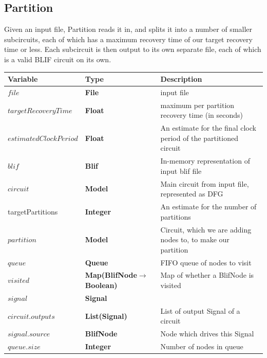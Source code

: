 \documentclass[12pt,final,oneside]{dwThesis} %
\begin{document}
   \newpage 
   \subsection{Partition}
   \label{algPartition} Given an input file,
   Partition reads it in, and splits it into a number of smaller subcircuits,
   each of which has a maximum recovery time of our target recovery time or
   less. Each subcircuit is then output to its own separate file, each of which
   is a valid \gls{BLIF} circuit on its own.  
   \begin{table}

      \begin{center}


         \begin{tabularx}
            {\linewidth}{llX} \toprule Variable & Type &
            Description\\
            \midrule $file$ &\textbf{File  } &  input file\\
            $targetRecoveryTime$ &\textbf{Float } &  maximum per partition
            recovery time (in seconds)\\
            $estimatedClockPeriod$ &\textbf{Float} & An estimate for the final clock period of the partitioned circuit\\
            $blif$ &\textbf{Blif } &  In-memory
            representation of input blif file\\
            $circuit$ &\textbf{Model }
            &  Main circuit from input file, represented as DFG\\
            targetPartitions & \textbf{Integer} & An estimate for the number of partitions \\
            $partition$
            &\textbf{Model } &  Circuit, which we are adding nodes to, to
            make our partition\\
            $queue$ &\textbf{Queue } &  FIFO queue of
            nodes to visit\\
            $visited$ &\textbf{Map(BlifNode$\to$ Boolean)}
            &  Map of whether a BlifNode is visited\\
            $signal$ &\textbf{Signal } &  \\
            $circuit.outputs$ &\textbf{List(Signal) } &
            List of output Signal of a circuit\\
            $signal.source$ &\textbf{BlifNode } &  Node which drives this Signal\\
            $queue.size$
            &\textbf{Integer } &  Number of nodes in queue\\

\end{tabularx}
\end{center}
\end{table}
\end{document}
